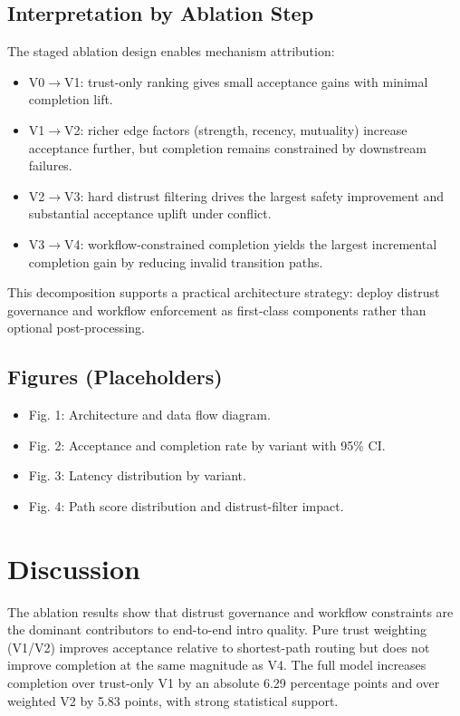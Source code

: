 \documentclass[conference]{IEEEtran}
\begin{document}
\subsection{Interpretation by Ablation Step}
The staged ablation design enables mechanism attribution:
\begin{itemize}
    \item V0$\rightarrow$V1: trust-only ranking gives small acceptance gains with minimal completion lift.
    \item V1$\rightarrow$V2: richer edge factors (strength, recency, mutuality) increase acceptance further, but completion remains constrained by downstream failures.
    \item V2$\rightarrow$V3: hard distrust filtering drives the largest safety improvement and substantial acceptance uplift under conflict.
    \item V3$\rightarrow$V4: workflow-constrained completion yields the largest incremental completion gain by reducing invalid transition paths.
\end{itemize}

This decomposition supports a practical architecture strategy: deploy distrust governance and workflow enforcement as first-class components rather than optional post-processing.

\subsection{Figures (Placeholders)}
\begin{itemize}
    \item Fig. 1: Architecture and data flow diagram.
    \item Fig. 2: Acceptance and completion rate by variant with 95\% CI.
    \item Fig. 3: Latency distribution by variant.
    \item Fig. 4: Path score distribution and distrust-filter impact.
\end{itemize}

\section{Discussion}
The ablation results show that distrust governance and workflow constraints are the dominant contributors to end-to-end intro quality. Pure trust weighting (V1/V2) improves acceptance relative to shortest-path routing but does not improve completion at the same magnitude as V4. The full model increases completion over trust-only V1 by an absolute 6.29 percentage points and over weighted V2 by 5.83 points, with strong statistical support.
\end{document}
